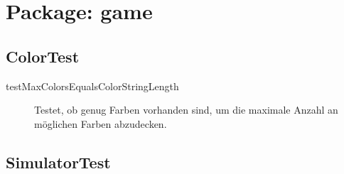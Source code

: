 \section{Package: game}

\subsection{ColorTest}

\begin{description}
\item[testMaxColorsEqualsColorStringLength]
Testet, ob genug Farben vorhanden sind, um die maximale Anzahl an möglichen Farben abzudecken.
\end{description}

\subsection{SimulatorTest}


